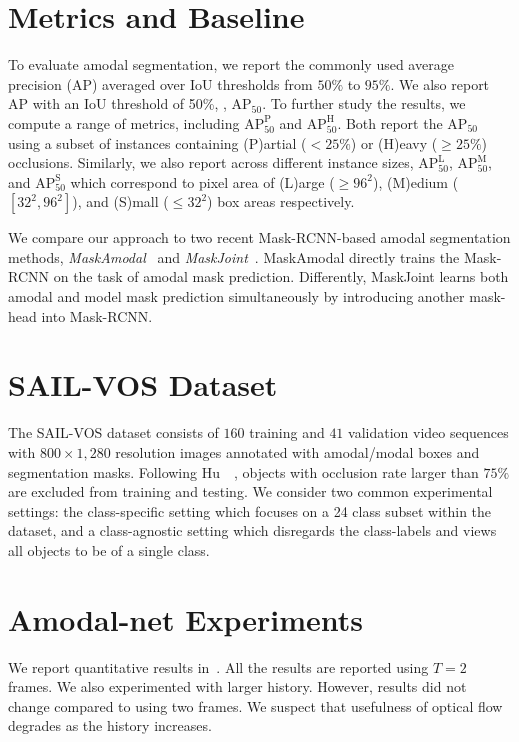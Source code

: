 

\section{Metrics and Baseline}

To evaluate amodal segmentation, we report the commonly used average precision (AP) averaged over IoU thresholds from $50\%$ to $95\%$. We also report AP with an IoU threshold of 50\%, \ie, $\text{AP}_{50}$. To further study the results, we compute a range of   metrics, including $\text{AP}_{\text{50}}^{\text{P}}$ and  $\text{AP}_{\text{50}}^{\text{H}}$. Both report the $\text{AP}_{50}$ using a subset of instances containing (P)artial ($<25\%$) or (H)eavy ($\geq25\%$) occlusions. Similarly, we also report across different instance sizes, $\text{AP}_{\text{50}}^{\text{L}}$, $\text{AP}_{\text{50}}^{\text{M}}$, and $\text{AP}_{\text{50}}^{\text{S}}$ which correspond to pixel area of (L)arge ($\geq 96^2$), (M)edium ($[32^2, 96^2]$), and (S)mall ($\leq 32^2$)  box areas respectively. 

We compare our approach to two recent Mask-RCNN-based amodal segmentation methods, {\it MaskAmodal}~\cite{follmann2019learning}  and {\it MaskJoint}~\cite{hu2019sail}. MaskAmodal directly trains the  Mask-RCNN on the task of amodal mask prediction. Differently, MaskJoint learns both amodal and model mask prediction simultaneously by introducing another mask-head into Mask-RCNN.


\section{SAIL-VOS Dataset}
The SAIL-VOS dataset consists of $160$ training and $41$ validation video sequences with $800 \times 1,280$ resolution images annotated with amodal/modal boxes and segmentation masks. 
Following Hu~\etal~\cite{hu2019sail}, objects with occlusion rate larger than $75\%$ are excluded from training and testing. We consider two common experimental settings: the class-specific setting which focuses on a 24 class subset within the dataset, and a class-agnostic setting which disregards the class-labels and views all objects to be of a single class. 

\section{Amodal-net Experiments}

We report quantitative results in~. 
All the results are reported using $T = 2$ frames. We also experimented with larger history. However, results did not change compared to using two frames. We suspect that usefulness of optical flow degrades as the history increases. %

